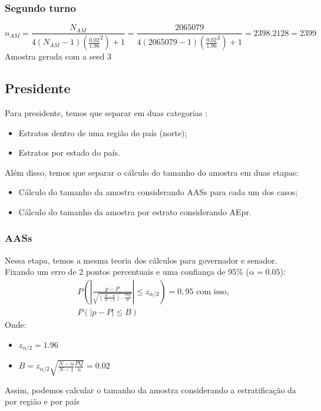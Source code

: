 \documentclass{article}
\begin{document}
\subsubsection*{Segundo turno}

\[
n_{AM} = \frac{N_{AM}}{4(N_{AM}-1)(\frac{0.02}{1.96}^2) + 1 } = \frac{2065079}{4(2065079 - 1) (\frac{0.02}{1.96}^2) + 1} = 2398.2128 = 2399
\]
Amostra gerada com a seed 3
\subsection*{Presidente}
Para presidente, temos que separar em duas categorias : 
\begin{itemize}
    \item Estratos dentro de uma região do país (norte);
    \item Estratos por estado do país.
\end{itemize}

Além disso, temos que separar o cálculo do tamanho do amostra em duas etapas:
\begin{itemize}
    \item Cálculo do tamanho da amostra considerando AASs para cada um dos casos;
    \item Cálculo do tamanho da amostra por estrato considerando AEpr.
\end{itemize}

\subsubsection*{AASs} 
Nessa etapa, temos a mesma teoria dos cálculos para governador e senador. Fixando um erro de 2 pontos percentuais e uma confiança de 95\% ($\alpha = 0.05$):
\[
\begin{array}{l}
P\left( \left| \frac{p - P}{\sqrt{ \left( \frac{N - n}{N - 1} \right) \cdot \frac{PQ}{n} }} \right| \leq z_{\alpha/2} \right) = 0{,}95 \text{ com isso,}\\ 
P\left( \left| p - P \right| \leq B \right)
\end{array}
\]
Onde:
\begin{itemize}
    \item $z_{\alpha/2} = 1.96$
    \item $B = z_{\alpha/2}\sqrt{\frac{N-n}{N-1}\frac{PQ}{n}} = 0.02$
\end{itemize}

Assim, podemos calcular o tamanho da amostra considerando a estratificação da por região e por país
\end{document}
